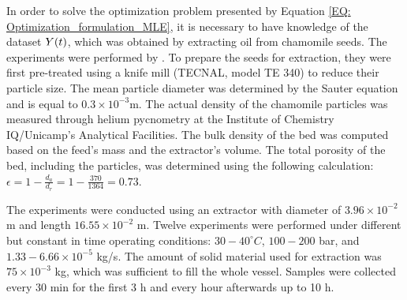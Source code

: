\documentclass[../Article_Model_Parameters.tex]{subfiles}
\begin{document}
	
	\label{CH: Experiments}
	
	In order to solve the optimization problem presented by Equation \ref{EQ: Optimization_formulation_MLE}, it is necessary to have knowledge of the dataset ${\color{black}Y}(t)$, which was obtained by extracting oil from chamomile seeds. The experiments were performed by \citet{Povh2001}. To prepare the seeds for extraction, they were first pre-treated using a knife mill (TECNAL, model TE 340) to reduce their particle size. The mean
	particle diameter was determined by the Sauter equation and is equal to $0.3\times 10^{-3}$m. The actual density of the chamomile particles was measured through helium pycnometry at the Institute of Chemistry IQ/Unicamp's Analytical Facilities. The bulk density of the bed was computed based on the feed's mass and the extractor's volume. The total porosity of the bed, including the particles, was determined using the following calculation: $\epsilon=1-\frac{d_a}{d_r} = 1-\frac{370}{1364} = 0.73$.
	
	
	The experiments were conducted using an extractor with diameter of $3.96\times 10^{-2}$ m and length $16.55\times 10^{-2}$ m. Twelve experiments were performed under different but constant in time operating conditions: $30-40^\circ C$, $100 - 200$ bar, and $1.33-6.66 \times 10^{-5}$ kg/s. The amount of solid material used for extraction was $75\times 10^{-3}$ kg, which was sufficient to fill the whole vessel. Samples were collected every 30 min for the first 3 h and every hour afterwards up to 10 h. 
	
	
\end{document}
